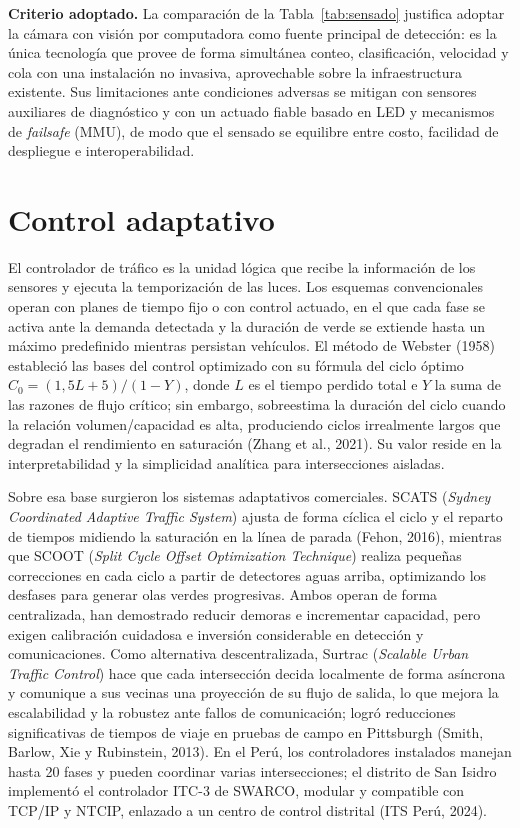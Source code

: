 \textbf{Criterio adoptado.} La comparación de la Tabla~\ref{tab:sensado} justifica adoptar la cámara con
visión por computadora como fuente principal de detección: es la única tecnología que provee de forma
simultánea conteo, clasificación, velocidad y cola con una instalación no invasiva, aprovechable sobre la
infraestructura existente. Sus limitaciones ante condiciones adversas se mitigan con sensores auxiliares de
diagnóstico y con un actuado fiable basado en LED y mecanismos de \emph{failsafe} (MMU), de modo que el
sensado se equilibre entre costo, facilidad de despliegue e interoperabilidad.

\section{Control adaptativo}\label{sec:control}

El controlador de tráfico es la unidad lógica que recibe la información de los sensores y ejecuta la
temporización de las luces. Los esquemas convencionales operan con planes de tiempo fijo o con control
actuado, en el que cada fase se activa ante la demanda detectada y la duración de verde se extiende hasta un
máximo predefinido mientras persistan vehículos. El método de Webster (1958) estableció las bases del control
optimizado con su fórmula del ciclo óptimo $C_0 = (1{,}5L + 5)/(1 - Y)$, donde $L$ es el tiempo perdido total
e $Y$ la suma de las razones de flujo crítico; sin embargo, sobreestima la duración del ciclo cuando la
relación volumen/capacidad es alta, produciendo ciclos irrealmente largos que degradan el rendimiento en
saturación (Zhang et al., 2021). Su valor reside en la interpretabilidad y la simplicidad analítica para
intersecciones aisladas.

Sobre esa base surgieron los sistemas adaptativos comerciales. SCATS (\emph{Sydney Coordinated Adaptive
Traffic System}) ajusta de forma cíclica el ciclo y el reparto de tiempos midiendo la saturación en la línea
de parada (Fehon, 2016), mientras que SCOOT (\emph{Split Cycle Offset Optimization Technique}) realiza
pequeñas correcciones en cada ciclo a partir de detectores aguas arriba, optimizando los desfases para
generar olas verdes progresivas. Ambos operan de forma centralizada, han demostrado reducir demoras e
incrementar capacidad, pero exigen calibración cuidadosa e inversión considerable en detección y
comunicaciones. Como alternativa descentralizada, Surtrac (\emph{Scalable Urban Traffic Control}) hace que
cada intersección decida localmente de forma asíncrona y comunique a sus vecinas una proyección de su flujo
de salida, lo que mejora la escalabilidad y la robustez ante fallos de comunicación; logró reducciones
significativas de tiempos de viaje en pruebas de campo en Pittsburgh (Smith, Barlow, Xie y Rubinstein, 2013).
En el Perú, los controladores instalados manejan hasta 20 fases y pueden coordinar varias intersecciones; el
distrito de San Isidro implementó el controlador ITC-3 de SWARCO, modular y compatible con TCP/IP y NTCIP,
enlazado a un centro de control distrital (ITS Perú, 2024).

